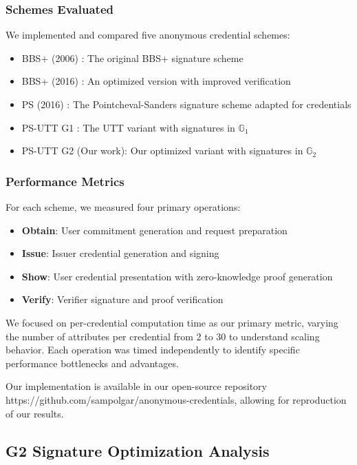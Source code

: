 \subsubsection{Schemes Evaluated}
We implemented and compared five anonymous credential schemes:
\begin{itemize}
    \item BBS+ (2006) \cite{hutchison_constant-size_2006}: The original BBS+ signature scheme
    \item BBS+ (2016) \cite{camenisch_anonymous_2016}: An optimized version with improved verification
    \item PS (2016) \cite{sako_short_2016}: The Pointcheval-Sanders signature scheme adapted for credentials
    \item PS-UTT G1 \cite{tomescu2022utt}: The UTT variant with signatures in $\mathbb{G}_1$
    \item PS-UTT G2 (Our work): Our optimized variant with signatures in $\mathbb{G}_2$
\end{itemize}

\subsubsection{Performance Metrics}
For each scheme, we measured four primary operations:
\begin{itemize}
    \item \textbf{Obtain}: User commitment generation and request preparation
    \item \textbf{Issue}: Issuer credential generation and signing
    \item \textbf{Show}: User credential presentation with zero-knowledge proof generation
    \item \textbf{Verify}: Verifier signature and proof verification
\end{itemize}

We focused on per-credential computation time as our primary metric, varying the number of attributes per credential from 2 to 30 to understand scaling behavior. Each operation was timed independently to identify specific performance bottlenecks and advantages.

Our implementation is available in our open-source repository https://github.com/sampolgar/anonymous-credentials, allowing for reproduction of our results.




\subsection{G2 Signature Optimization Analysis}\

